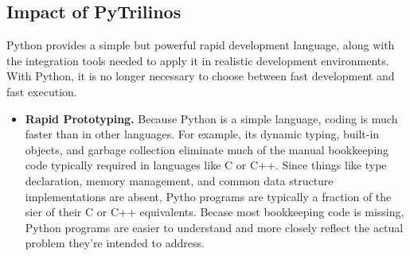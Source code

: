 \documentclass[10pt,relax]{SANDreport}
\newcommand{\PyTrilinos}{{PyTrilinos}}
\begin{document}
\subsection{Impact of \PyTrilinos}
\label{sec:impact}

Python provides a simple but powerful rapid development language, along with
the integration tools needed to apply it in realistic development
environments. With Python, it is no longer necessary to choose between fast
development and fast execution.   

\begin{itemize}
\item {\bf Rapid Prototyping.}
Because Python is a simple language, coding is much faster than in other
  languages. For example, its dynamic typing, built-in objects, and garbage
  collection eliminate much of the manual bookkeeping code typically required
  in languages like C or C++. Since things like type declaration, memory
  management, and common data structure implementations are absent, Pytho
  programs are typically a fraction of the sier of their C or C++ equivalents.
  Becase most bookkeeping code is missing, Python programs are easier to
  understand and more closely reflect the actual problem they're intended to
  address. 


\end{itemize}
\end{document}
